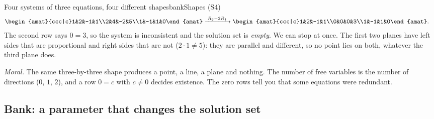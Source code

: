 \documentclass[11pt]{article}
\begin{document}
\begin{exmp}{Four systems of three equations, four different shapes}{bankShapes}
(S4)~
\begin{align*}
&\begin{amat}{ccc|c}1&2&-1&1\\2&4&-2&5\\1&-1&1&0\end{amat}
\rops{R_2-2R_1}
\begin{amat}{ccc|c}1&2&-1&1\\0&0&0&3\\1&-1&1&0\end{amat}.
\end{align*}
The second row says $0=3$, so the system is inconsistent and the solution set is \emph{empty}. We can stop at once. The first two planes have left sides that are proportional and right sides that are not ($2\cdot1\neq5$): they are parallel and different, so no point lies on both, whatever the third plane does.

\emph{Moral.} The same three-by-three shape produces a point, a line, a plane and nothing. The number of free variables is the number of directions ($0$, $1$, $2$), and a row $0=c$ with $c\neq0$ decides existence. The zero rows tell you that some equations were redundant.
\end{exmp}

\subsection*{Bank: a parameter that changes the solution set}
\end{document}
